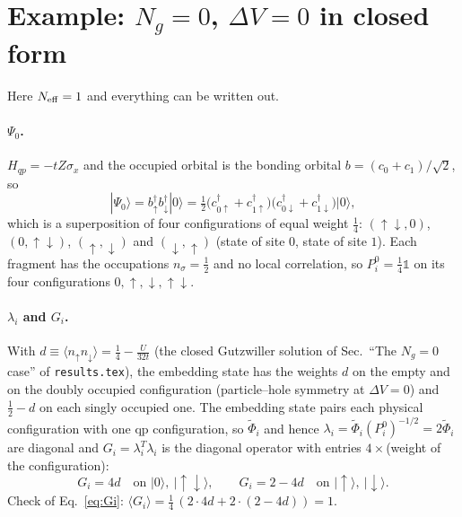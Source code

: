\documentclass[11pt]{article}
\newcommand{\Ng}{N_g}
\newcommand{\dV}{\Delta V}
\begin{document}
\section{Example: $\Ng=0$, $\dV=0$ in closed form}
Here $N_{\rm eff}=1$ and everything can be written out.

\paragraph{$\Psi_0$.} $H_{qp}=-tZ\sigma_x$ and the occupied orbital is the bonding orbital $b=(c_0+c_1)/\sqrt2$, so
\begin{equation}
|\Psi_0\rangle=b^\dagger_\uparrow b^\dagger_\downarrow|0\rangle=\tfrac12\big(c^\dagger_{0\uparrow}+c^\dagger_{1\uparrow}\big)\big(c^\dagger_{0\downarrow}+c^\dagger_{1\downarrow}\big)|0\rangle ,
\end{equation}
which is a superposition of four configurations of equal weight $\tfrac14$: $(\uparrow\downarrow,0)$, $(0,\uparrow\downarrow)$, $(\uparrow,\downarrow)$ and $(\downarrow,\uparrow)$ (state of site $0$, state of site $1$). Each fragment has the occupations $n_\sigma=\tfrac12$ and no local correlation, so $P^0_i=\tfrac14\mathbb 1$ on its four configurations $0,\uparrow,\downarrow,\uparrow\downarrow$.

\paragraph{$\lambda_i$ and $G_i$.} With $d\equiv\langle n_\uparrow n_\downarrow\rangle=\tfrac14-\tfrac{U}{32t}$ (the closed Gutzwiller solution of Sec.~``The $\Ng=0$ case'' of \texttt{results.tex}), the embedding state has the weights $d$ on the empty and on the doubly occupied configuration (particle--hole symmetry at $\dV=0$) and $\tfrac12-d$ on each singly occupied one. The embedding state pairs each physical configuration with one qp configuration, so $\tilde\Phi_i$ and hence $\lambda_i=\tilde\Phi_i(P^0_i)^{-1/2}=2\tilde\Phi_i$ are diagonal and $G_i=\lambda_i^T\lambda_i$ is the diagonal operator with entries $4\times$(weight of the configuration):
\begin{equation}
G_i=4d\quad\text{on }|0\rangle,\ |\!\uparrow\downarrow\rangle,\qquad G_i=2-4d\quad\text{on }|\!\uparrow\rangle,\ |\!\downarrow\rangle .
\end{equation}
Check of Eq.~\eqref{eq:Gi}: $\langle G_i\rangle=\tfrac14\,(2\cdot4d+2\cdot(2-4d))=1$.
\end{document}
